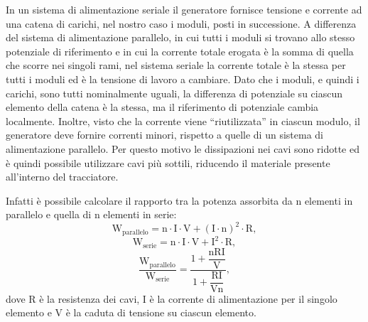 In un sistema di alimentazione seriale il generatore fornisce tensione e corrente ad una catena di carichi, nel nostro caso i moduli, posti in successione. A differenza del sistema di alimentazione parallelo, in cui tutti i moduli si trovano allo stesso potenziale di riferimento e in cui la corrente totale erogata è la somma di quella che scorre nei singoli rami, nel sistema seriale la corrente totale è la stessa per tutti i moduli ed è la tensione di lavoro a cambiare. Dato che i moduli, e quindi i carichi, sono tutti nominalmente uguali, la differenza di potenziale su ciascun elemento della catena è la stessa, ma il riferimento di potenziale cambia localmente.
Inoltre, visto che la corrente viene ``riutilizzata'' in ciascun modulo, il generatore deve fornire correnti minori, rispetto a quelle di un sistema di alimentazione parallelo.
Per questo motivo le dissipazioni nei cavi sono ridotte ed è quindi possibile utilizzare cavi più sottili, riducendo il materiale presente all'interno del tracciatore.

Infatti è possibile calcolare il rapporto tra la potenza assorbita da n elementi in parallelo e quella di n elementi in serie:
\begin{equation}
\mathrm{W_{parallelo} = n \cdot I \cdot V + (I\cdot n)^2 \cdot R},
\end{equation}
\begin{equation}
\mathrm{W_{serie} = n \cdot I \cdot V + I^2 \cdot R},
\end{equation}
\begin{equation}
\mathrm{\frac{W_{parallelo}}{W_{serie}} = \frac{1+ \dfrac{nRI}{V}}{1+\dfrac{RI}{Vn}}},
\end{equation}
dove R è la resistenza dei cavi, I è la corrente di alimentazione per il singolo elemento e V è la caduta di tensione su ciascun elemento. 

